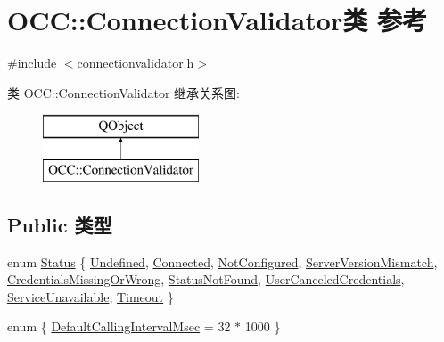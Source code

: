 \hypertarget{class_o_c_c_1_1_connection_validator}{}\section{O\+CC\+:\+:Connection\+Validator类 参考}
\label{class_o_c_c_1_1_connection_validator}


{\ttfamily \#include $<$connectionvalidator.\+h$>$}

类 O\+CC\+:\+:Connection\+Validator 继承关系图\+:\begin{figure}[H]
\begin{center}
\leavevmode
\includegraphics[height=2.000000cm]{class_o_c_c_1_1_connection_validator}
\end{center}
\end{figure}
\subsection*{Public 类型}
\begin{DoxyCompactItemize}
\item 
enum \hyperlink{class_o_c_c_1_1_connection_validator_a8f1192e5d8ff687dbf93faf38af67f8b}{Status} \{ \newline
\hyperlink{class_o_c_c_1_1_connection_validator_a8f1192e5d8ff687dbf93faf38af67f8ba00582fe33012894056a28bf25c37d323}{Undefined}, 
\hyperlink{class_o_c_c_1_1_connection_validator_a8f1192e5d8ff687dbf93faf38af67f8ba368890d7d9fcd3e0f15d20dbc7365c45}{Connected}, 
\hyperlink{class_o_c_c_1_1_connection_validator_a8f1192e5d8ff687dbf93faf38af67f8badc7d2d8d424b26253d5c06593ecc351a}{Not\+Configured}, 
\hyperlink{class_o_c_c_1_1_connection_validator_a8f1192e5d8ff687dbf93faf38af67f8badc8a3cca96a4655fa6171d619da64468}{Server\+Version\+Mismatch}, 
\newline
\hyperlink{class_o_c_c_1_1_connection_validator_a8f1192e5d8ff687dbf93faf38af67f8ba9c8f9547a3d243a2380778f8f2695a90}{Credentials\+Missing\+Or\+Wrong}, 
\hyperlink{class_o_c_c_1_1_connection_validator_a8f1192e5d8ff687dbf93faf38af67f8bac46732e09112cbcf21b2516f40eb9545}{Status\+Not\+Found}, 
\hyperlink{class_o_c_c_1_1_connection_validator_a8f1192e5d8ff687dbf93faf38af67f8bab0b52d5d61655df4c715f3812a6a6495}{User\+Canceled\+Credentials}, 
\hyperlink{class_o_c_c_1_1_connection_validator_a8f1192e5d8ff687dbf93faf38af67f8bae783b288e74b28b13f450276ff7247ef}{Service\+Unavailable}, 
\newline
\hyperlink{class_o_c_c_1_1_connection_validator_a8f1192e5d8ff687dbf93faf38af67f8bac2e23ff790d840eb991a12cd3f766382}{Timeout}
 \}
\item 
enum \{ \hyperlink{class_o_c_c_1_1_connection_validator_a641b1de72c72fe6d9132f5a8a9857eb5adaea5cd1ca3bd0fb9b2d3d86556972d0}{Default\+Calling\+Interval\+Msec} = 32 $\ast$ 1000
 \}
\end{DoxyCompactItemize}
